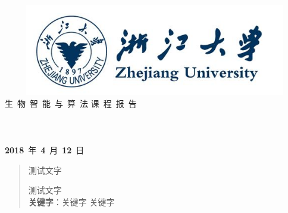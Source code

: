 \documentclass[UTF8]{ctexart}
\begin{document}
	\begin{titlepage}
		\centering
		\vspace*{1.75cm}
		\quad\includegraphics[width=15cm,height=4cm]{zju.png}\\
		\vspace*{1cm}
		{\fontsize{40pt}\baselineskip 生\ 物\ 智\ 能\ 与\ 算\ 法\vskip 0.5cm 课\ 程\ 报\ 告}
		 \vskip 5cm
		 \fontsize{19pt}\baselineskip
		 \underline{}\\%
		 \vskip 1.0cm
		 \underline{}\\
		 \vskip 1.0cm
		 \underline{}\\
		 \vskip 1.0cm
		 \underline{}\\
		 \vskip 1.2cm
		 \LARGE \textbf{2018}~年~\textbf{4}~月~\textbf{12}~日		 
	\end{titlepage}

 \begin{abstract}
 	\pagestyle{plain}
 	\thispagestyle{empty}
	\par 测试文字
	\par 测试文字	
	\\[0.5cm]
	\textbf{关键字}：\quad 关键字 \quad 关键字 
	\newpage
\end{abstract}

\tableofcontents%
\end{document}
